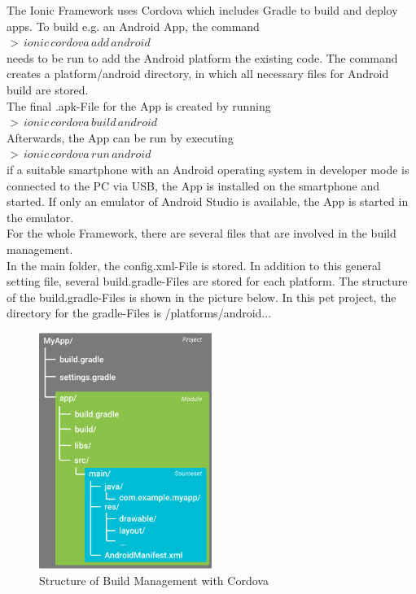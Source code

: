 \documentclass[12pt]{article}
\begin{document}
The Ionic Framework uses Cordova which includes Gradle to build and deploy apps. To build e.g. an Android App, the command\\
$ > \, ionic\, cordova\, add\, android $\\
needs to be run to add the Android platform the existing code. The command creates a platform/android directory, in which all necessary files for Android build are stored.\\
The final .apk-File for the App is created by running\\
$ > \, ionic\, cordova\, build\, android $\\
Afterwards, the App can be run by executing\\
$ > \, ionic\, cordova\, run\, android $ \\
if a suitable smartphone with an Android operating system in developer mode is connected to the PC via USB, the App is installed on the smartphone and started. If only an emulator of Android Studio is available, the App is started in the emulator.\\
For the whole Framework, there are several files that are involved in the build management.\\
In the main folder, the config.xml-File is stored. In addition to this general setting file, several build.gradle-Files are stored for each platform. The structure of the build.gradle-Files is shown in the picture below. In this pet project, the directory for the gradle-Files is /platforms/android...
\begin{figure}[H]
  \centering
    \includegraphics[width=0.5\textwidth]{figures/gradle_files.png}
    \caption{Structure of Build Management with Cordova}
\end{figure}
\end{document}
